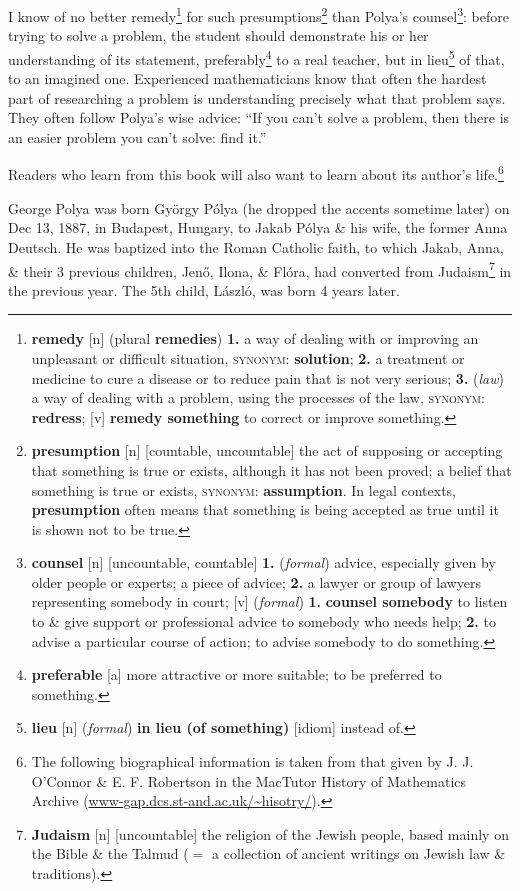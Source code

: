 \documentclass[oneside]{book}
\numberwithin{equation}{section}
\begin{document}
I know of no better remedy\footnote{\textbf{remedy} [n] (plural \textbf{remedies}) \textbf{1.} a way of dealing with or improving an unpleasant or difficult situation, \textsc{synonym}: \textbf{solution}; \textbf{2.} a treatment or medicine to cure a disease or to reduce pain that is not very serious; \textbf{3.} (\textit{law}) a way of dealing with a problem, using the processes of the law, \textsc{synonym}: \textbf{redress}; [v] \textbf{remedy something} to correct or improve something.} for such presumptions\footnote{\textbf{presumption} [n] [countable, uncountable] the act of supposing or accepting that something is true or exists, although it has not been proved; a belief that something is true or exists, \textsc{synonym}: \textbf{assumption}. In legal contexts, \textbf{presumption} often means that something is being accepted as true until it is shown not to be true.} than Polya's counsel\footnote{\textbf{counsel} [n] [uncountable, countable] \textbf{1.} (\textit{formal}) advice, especially given by older people or experts; a piece of advice; \textbf{2.} a lawyer or group of lawyers representing somebody in court; [v] (\textit{formal}) \textbf{1.} \textbf{counsel somebody} to listen to \& give support or professional advice to somebody who needs help; \textbf{2.} to advise a particular course of action; to advise somebody to do something.}: before trying to solve a problem, the student should demonstrate his or her understanding of its statement, preferably\footnote{\textbf{preferable} [a] more attractive or more suitable; to be preferred to something.} to a real teacher, but in lieu\footnote{\textbf{lieu} [n] (\textit{formal}) \textbf{in lieu (of something)} [idiom] instead of.} of that, to an imagined one. Experienced mathematicians know that often the hardest part of researching a problem is understanding precisely what that problem says. They often follow Polya's wise advice: ``If you can't solve a problem, then there is an easier problem you can't solve: find it.''

Readers who learn from this book will also want to learn about its author's life.\footnote{The following biographical information is taken from that given by J. J. O'Connor \& E. F. Robertson in the MacTutor History of Mathematics Archive (\url{www-gap.dcs.st-and.ac.uk/~hisotry/}).}

George Polya was born Gy\"orgy P\'olya (he dropped the accents sometime later) on Dec 13, 1887, in Budapest, Hungary, to Jakab P\'olya \& his wife, the former Anna Deutsch. He was baptized into the Roman Catholic faith, to which Jakab, Anna, \& their 3 previous children, Jen\H{o}, Ilona, \& Fl\'ora, had converted from Judaism\footnote{\textbf{Judaism} [n] [uncountable] the religion of the Jewish people, based mainly on the Bible \& the Talmud ($=$ a collection of ancient writings on Jewish law \& traditions).} in the previous year. The 5th child, L\'aszl\'o, was born 4 years later.
\end{document}
